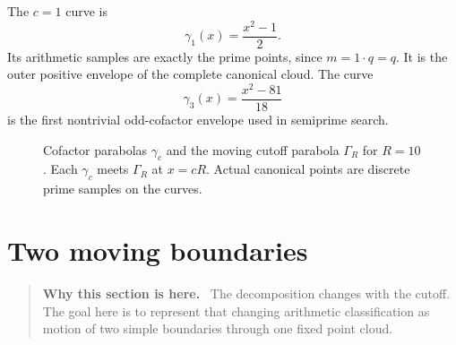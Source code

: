 \documentclass[11pt]{article}
\theoremstyle{definition}
\theoremstyle{remark}
\newcommand{\1}{\mathbf{1}}
\newcommand{\Repart}{\operatorname{Re}}
\newcommand{\Impart}{\operatorname{Im}}
\newenvironment{motivation}
  {\begin{quote}\small\color{ovvogray}\textbf{Why this section is here.}\ }
  {\end{quote}}
\begin{document}
The $c=1$ curve is
\begin{equation}
 \gamma_1(x)=\frac{x^2-1}{2}.
 \label{eq:prime-curve}
\end{equation}
Its arithmetic samples are exactly the prime points, since $m=1\cdot q=q$.  It is the outer positive envelope of the complete canonical cloud.  The curve
\begin{equation}
 \gamma_3(x)=\frac{x^2-81}{18}
 \label{eq:three-curve}
\end{equation}
is the first nontrivial odd-cofactor envelope used in semiprime search.

\begin{figure}[htbp]
\centering
{}
\caption{Cofactor parabolas $\gamma_c$ and the moving cutoff parabola $\Gamma_R$ for $R=10$.  Each $\gamma_c$ meets $\Gamma_R$ at $x=cR$.  Actual canonical points are discrete prime samples on the curves.}
\label{fig:cofactor-parabolas}
\end{figure}

\section{Two moving boundaries}
\label{sec:moving-cutoff}

\begin{motivation}
The decomposition changes with the cutoff.  The goal here is to represent that changing arithmetic classification as motion of two simple boundaries through one fixed point cloud.
\end{motivation}
\end{document}
